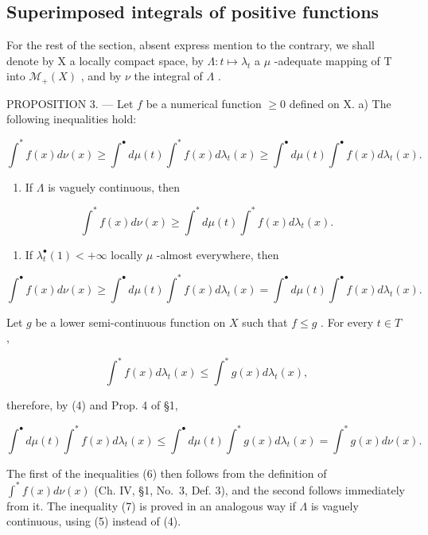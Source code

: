 \subsection{Superimposed integrals of positive functions}

For the rest of the section, absent express mention to the contrary, we shall denote by X a locally compact space, by \(\Lambda: t \mapsto \lambda_{t}\) a \(\mu\) -adequate mapping of T into \(\mathcal{M}_{+}(X)\) , and by \(\nu\) the integral of \(\Lambda\) .

PROPOSITION 3. --- Let \(f\) be a numerical function \(\geqslant 0\) defined on X. a) The following inequalities hold:

\[
\int^ {*} f (x) d \nu (x) \geqslant \int^ {\bullet} d \mu (t) \int^ {*} f (x) d \lambda_ {t} (x) \geqslant \int^ {\bullet} d \mu (t) \int^ {\bullet} f (x) d \lambda_ {t} (x). \tag {6}
\]

\begin{enumerate}
\def\labelenumi{\alph{enumi})}
\setcounter{enumi}{1}
\tightlist
\item
  If \(\Lambda\) is vaguely continuous, then
\end{enumerate}

\[
\int^ {*} f (x) d \nu (x) \geqslant \int^ {*} d \mu (t) \int^ {*} f (x) d \lambda_ {t} (x).\tag{7}
\]

\begin{enumerate}
\def\labelenumi{\alph{enumi})}
\setcounter{enumi}{2}
\tightlist
\item
  If \(\lambda_t^\bullet (1) <   + \infty\) locally \(\mu\) -almost everywhere, then
\end{enumerate}

\[
\int^ {\bullet} f (x) d \nu (x) \geqslant \int^ {\bullet} d \mu (t) \int^ {*} f (x) d \lambda_ {t} (x) = \int^ {\bullet} d \mu (t) \int^ {\bullet} f (x) d \lambda_ {t} (x). \tag {8}
\]

Let \(g\) be a lower semi-continuous function on \(X\) such that \(f \leqslant g\) . For every \(t \in T\) ,

\[
\int^ {*} f (x) d \lambda_ {t} (x) \leqslant \int^ {*} g (x) d \lambda_ {t} (x),
\]

therefore, by (4) and Prop. 4 of §1,

\[
\int^ {\bullet} d \mu (t) \int^ {*} f (x) d \lambda_ {t} (x) \leqslant \int^ {\bullet} d \mu (t) \int^ {*} g (x) d \lambda_ {t} (x) = \int^ {*} g (x) d \nu (x).
\]

The first of the inequalities (6) then follows from the definition of \(\int^{*}f(x)d\nu(x)\) (Ch. IV, §1, No.~3, Def. 3), and the second follows immediately from it. The inequality (7) is proved in an analogous way if \(\Lambda\) is vaguely continuous, using (5) instead of (4).


